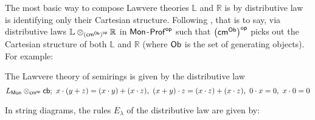 The most basic way to compose Lawvere theories $\mathbb L$ and $\mathbb R$ is by distributive law  is identifying only their Cartesian structure.   Following \cite[Proposition 5.4]{lawvere}, that is to say, via distributive laws $\mathbb{L} \otimes_{\left({\sf cm}^{\sf Ob}\right)^{\mathsf{op}}} \mathbb{R}$ in ${\sf Mon}$-${\sf Prof}^{\mathsf{op}}$ such that $\left({\sf cm}^{\sf Ob}\right)^{\mathsf{op}}$ picks out the Cartesian structure of both $\mathbb L$ and $\mathbb R$ (where $\sf Ob$ is the set of generating objects).  For example:
\begin{example}
The Lawvere theory of semirings is given by the distributive law
$$
L_{\sf Mon} \otimes_{{\sf cm}^{\mathsf{op}}} {\sf cb}; \
x\cdot (y+z) = (x\cdot  y)+(x\cdot z) , \
(x+ y)\cdot z = (x\cdot z)+(x\cdot z), \
0 \cdot x = 0 , \
x \cdot 0 = 0
$$
\end{example}
In string diagrams, the rules $E_\lambda$ of the distributive law are given by:
